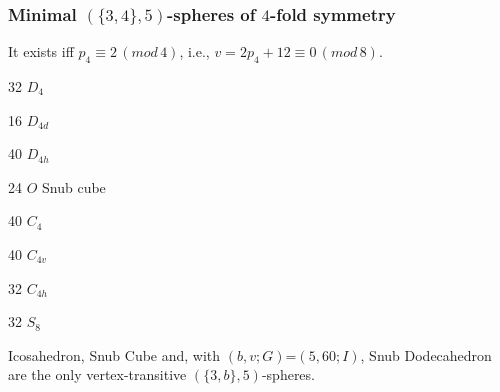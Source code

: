 \documentclass{beamer}
\begin{document}
\begin{frame}\frametitle{Minimal  $(\{3,4\},5)$-spheres of $4$-fold symmetry}        
\vspace{-1mm} 
It exists iff  $p_4\equiv 2\,(mod\,4)$, i.e.,  $v=2p_4+12\equiv 
0\,(mod\,8)$.  
\begin{center}
\begin{minipage}[b]{26mm}\centering
{}\par
32 $D_{4}$   
\end{minipage}
\begin{minipage}[b]{26mm}
\centering
{}\par
16 $D_{4d}$
\end{minipage}
\begin{minipage}[b]{26mm}\centering
{}\par
40  $D_{4h}$
\end{minipage}
\begin{minipage}[b]{26mm}\centering
{}\par
24 $O$ Snub cube
\end{minipage}
\end{center} 

\begin{center}
\begin{minipage}[b]{26mm}
\centering
{}\par
40 $C_{4}$
\end{minipage}
\begin{minipage}[b]{26mm}\centering
{}\par
40  $C_{4v}$
\end{minipage}
\begin{minipage}[b]{26mm}\centering
{}\par
32 $C_{4h}$
\end{minipage}
\begin{minipage}[b]{26mm}
\centering
{}\par
32 $S_8$
\end{minipage}
\end{center}  
Icosahedron, Snub Cube and, with 
$(b,v;G)$=$(5,60;I)$,  Snub 
Dodecahedron are the only 
vertex-transitive  
$(\{3,b\},5)$-spheres.


\end{frame}
\end{document}
